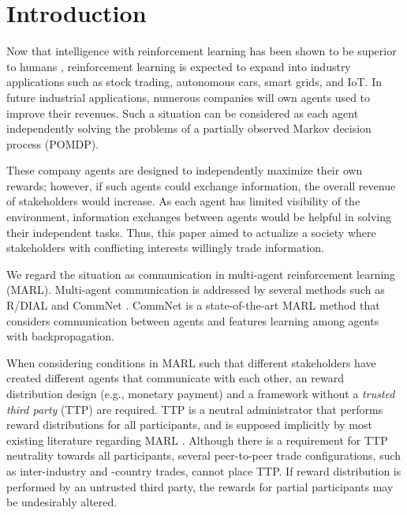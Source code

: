 \section{Introduction}

Now that intelligence with reinforcement learning has been shown to be superior to humans \citep{tesauro1995temporal,mnih2015human,silver2016mastering}, reinforcement learning is expected to expand into industry applications such as stock trading, autonomous cars, smart grids, and IoT. 
In future industrial applications, numerous companies will own agents used to improve their revenues.
Such a situation can be considered as each agent independently solving the problems of a partially observed Markov decision process (POMDP).

These company agents are designed to independently maximize their own rewards; 
however, if such agents could exchange information, the overall revenue of stakeholders would increase.
As each agent has limited visibility of the environment, information exchanges between agents would be helpful in solving their independent tasks.
Thus, this paper aimed to actualize a society where stakeholders with conflicting interests willingly trade information.

We regard the situation as communication in multi-agent reinforcement learning (MARL).
Multi-agent communication is addressed by several methods such as R/DIAL \citep{foerster2016learning} and CommNet \citep{sukhbaatar2016learning}.
CommNet is a state-of-the-art MARL method that considers communication between agents 
and features learning among agents with backpropagation.

When considering conditions in MARL such that different stakeholders have created different agents that communicate with each other, an reward distribution design (e.g., monetary payment) and a framework without a {\em trusted third party} (TTP) are required.
TTP \citep{wu1999game,sandholm2002possibility} is a neutral administrator that performs reward distributions for all participants, and is supposed implicitly by most existing literature regarding MARL \citep{agogino2006quicr,foerster2016learning,sukhbaatar2016learning}.
Although there is a requirement for TTP neutrality towards all participants,
several peer-to-peer trade configurations, such as inter-industry and -country trades, cannot place TTP.
If reward distribution is performed by an untrusted third party, the rewards for partial participants may be undesirably altered.

